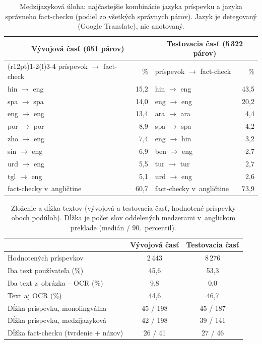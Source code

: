 \begin{table}[t]
\centering
\caption{Medzijazyková úloha: najčastejšie kombinácie jazyka príspevku a jazyka správneho fact-checku (podiel zo všetkých správnych párov). Jazyk je detegovaný (Google Translate), nie anotovaný.}
\label{tab:crosslang}
\begin{tabular}{lr @{\hspace{18pt}} lr}
\toprule
\multicolumn{2}{c}{Vývojová časť (651 párov)} & \multicolumn{2}{c}{Testovacia časť (5\,322 párov)} \\
\cmidrule(r{12pt}){1-2}\cmidrule(l){3-4}
príspevok $\to$ fact-check & \% & príspevok $\to$ fact-check & \% \\
\midrule
hin $\to$ eng & 15{,}2 & hin $\to$ eng & 43{,}5 \\
spa $\to$ spa & 14{,}0 & eng $\to$ eng & 20{,}2 \\
eng $\to$ eng & 13{,}4 & ara $\to$ ara & 4{,}4 \\
por $\to$ por & 8{,}9 & spa $\to$ spa & 4{,}2 \\
zho $\to$ eng & 7{,}4 & eng $\to$ hin & 3{,}2 \\
sin $\to$ eng & 6{,}9 & ben $\to$ eng & 2{,}7 \\
urd $\to$ eng & 5{,}5 & tur $\to$ tur & 2{,}7 \\
tgl $\to$ eng & 5{,}1 & urd $\to$ eng & 2{,}6 \\
\midrule
fact-checky v~angličtine & 60{,}7 & fact-checky v~angličtine & 73{,}9 \\
\bottomrule
\end{tabular}
\end{table}

\begin{table}[t]
\centering
\caption{Zloženie a dĺžka textov (vývojová a testovacia časť, hodnotené príspevky oboch podúloh). Dĺžka je počet slov oddelených medzerami v~anglickom preklade (medián / 90.~percentil).}
\label{tab:composition}
\begin{tabular}{lcc}
\toprule
 & Vývojová časť & Testovacia časť \\
\midrule
Hodnotených príspevkov & 2\,443 & 8\,276 \\
Iba text používateľa (\%) & 45{,}6 & 53{,}3 \\
Iba text z~obrázka -- OCR (\%) & 9{,}8 & 0{,}0 \\
Text aj OCR (\%) & 44{,}6 & 46{,}7 \\
Dĺžka príspevku, monolingválna & 45 / 198 & 45 / 187 \\
Dĺžka príspevku, medzijazyková & 42 / 198 & 39 / 141 \\
Dĺžka fact-checku (tvrdenie + názov) & 26 / 41 & 27 / 46 \\
\bottomrule
\end{tabular}
\end{table}
